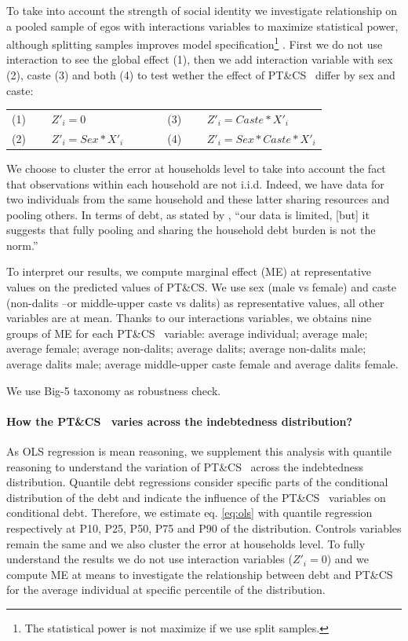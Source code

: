 \documentclass[a4paper, 11pt, onecolumn]{article}
\newcommand{\PTCS}{PT\&CS}
\begin{document}
To take into account the strength of social identity we investigate relationship on a pooled sample of egos with interactions variables to maximize statistical power, although splitting samples improves model specification\footnote{The statistical power is not maximize if we use split samples.} .
First we do not use interaction to see the global effect (1), then we add interaction variable with sex (2), caste (3) and both (4) to test wether the effect of \PTCS~ differ by sex and caste:

\begin{table}[h!]
  \centering
    \begin{tabular}{lllll}
    (1)~~~~ $Z'_{i}=0$ & & & & (3)~~~~ $Z'_{i}=Caste*X'_{i}$ \\
    (2)~~~~ $Z'_{i}=Sex*X'_{i}$ & & & & (4)~~~~ $Z'_{i}=Sex*Caste*X'_{i}$ \\
    \end{tabular}%
\end{table}%

We choose to cluster the error at households level to take into account the fact that observations within each household are not i.i.d.
Indeed, we have data for two individuals from the same household and these latter sharing resources and pooling others.%
In terms of debt, as stated by \cite{Reboul2021}, ``our data is limited, [but] it suggests that fully pooling and sharing the household debt burden is not the norm.''

To interpret our results, we compute marginal effect (ME) at representative values on the predicted values of \PTCS.%
We use sex (male vs female) and caste (non-dalits --or middle-upper caste vs dalits) as representative values, all other variables are at mean.
Thanks to our interactions variables, we obtains nine groups of ME for each \PTCS~ variable: average individual; average male; average female; average non-dalits; average dalits; average non-dalits male; average dalits male; average middle-upper caste female and average dalits female. 

We use Big-5 taxonomy as robustness check.

\paragraph{How the \PTCS~ varies across the indebtedness distribution?}
As OLS regression is mean reasoning, we supplement this analysis with quantile reasoning to understand the variation of \PTCS~ across the indebtedness distribution.
Quantile debt regressions consider specific parts of the conditional distribution of the debt and indicate the influence of the \PTCS~ variables on conditional debt.
Therefore, we estimate eq. \ref{eq:ols} with quantile regression respectively at P10, P25, P50, P75 and P90 of the distribution.
Controls variables remain the same and we also cluster the error at households level.
To fully understand the results we do not use interaction variables ($Z'_{i}=0$) and we compute ME at means to investigate the relationship between debt and \PTCS~ for the average individual at specific percentile of the distribution.
\end{document}
